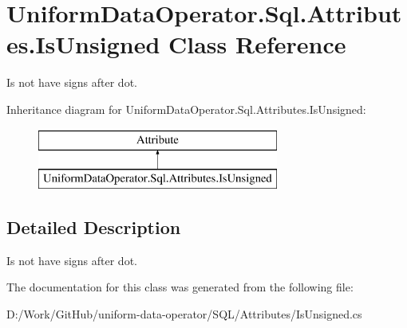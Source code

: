 \hypertarget{class_uniform_data_operator_1_1_sql_1_1_attributes_1_1_is_unsigned}{}\section{Uniform\+Data\+Operator.\+Sql.\+Attributes.\+Is\+Unsigned Class Reference}
\label{class_uniform_data_operator_1_1_sql_1_1_attributes_1_1_is_unsigned}


Is not have signs after dot.  


Inheritance diagram for Uniform\+Data\+Operator.\+Sql.\+Attributes.\+Is\+Unsigned\+:\begin{figure}[H]
\begin{center}
\leavevmode
\includegraphics[height=2.000000cm]{d5/d70/class_uniform_data_operator_1_1_sql_1_1_attributes_1_1_is_unsigned}
\end{center}
\end{figure}


\subsection{Detailed Description}
Is not have signs after dot. 



The documentation for this class was generated from the following file\+:\begin{DoxyCompactItemize}
\item 
D\+:/\+Work/\+Git\+Hub/uniform-\/data-\/operator/\+S\+Q\+L/\+Attributes/Is\+Unsigned.\+cs\end{DoxyCompactItemize}
